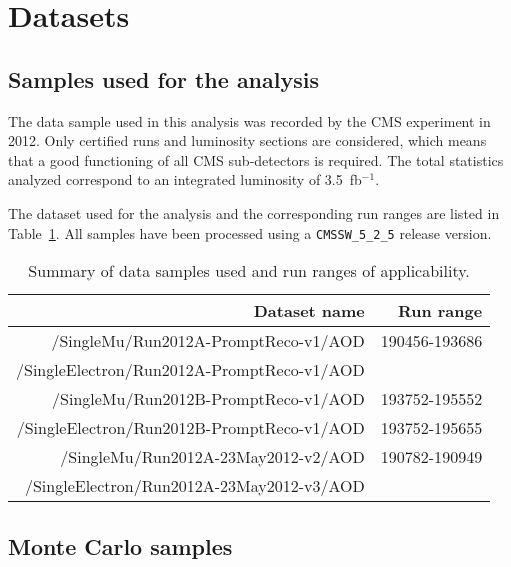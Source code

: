 \section{Datasets}
\label{sec:technicalities}

\subsection{Samples used for the analysis}

The data sample used in this analysis was recorded by the CMS experiment in 2012.
Only certified runs and luminosity sections are considered, which means that a good functioning
of all CMS sub-detectors is required. The total statistics analyzed correspond to an integrated
luminosity of 3.5~fb$^{-1}$. %

The dataset used for the analysis and the corresponding run ranges are listed in Table~\ref{tab:datasets}.
All samples have been processed using a \texttt{CMSSW\_5\_2\_5} release version.

\begin{table}[htb]
  \begin{center}
  \begin{tabular}{r|r}
  \hline
  Dataset name & Run range \\
  \hline
  /SingleMu/Run2012A-PromptReco-v1/AOD   & 190456-193686  \\
  /SingleElectron/Run2012A-PromptReco-v1/AOD   &            \\ 
  \hline
  /SingleMu/Run2012B-PromptReco-v1/AOD   &  193752-195552  \\
  /SingleElectron/Run2012B-PromptReco-v1/AOD         &  193752-195655    \\
  \hline
  /SingleMu/Run2012A-23May2012-v2/AOD   &  190782-190949  \\
  /SingleElectron/Run2012A-23May2012-v3/AOD   &         \\
  \hline
  \hline
  \end{tabular}
  \end{center}
  \caption{Summary of data samples used and run ranges of applicability.}
  \label{tab:datasets}
\end{table}%

\subsection{Monte Carlo samples}


